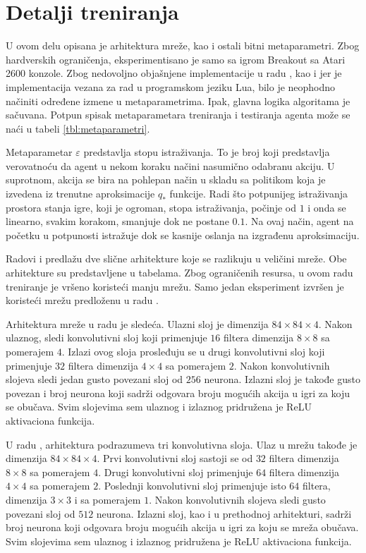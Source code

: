 \section{Detalji treniranja}
\label{sec:treniranje}
U ovom delu opisana je arhitektura mreže, kao i ostali bitni metaparametri. Zbog hardverskih ograničenja, eksperimentisano je samo sa igrom Breakout sa Atari 2600 konzole. Zbog nedovoljno objašnjene implementacije u radu \cite{dqn_mnih}, kao i jer je implementacija vezana za rad \cite{dqn_dm} u programskom jeziku Lua, bilo je neophodno načiniti određene izmene u metaparametrima. Ipak, glavna logika algoritama je sačuvana. Potpun spisak metaparametara treniranja i testiranja agenta može se naći u tabeli \ref{tbl:metaparametri}.
\par 
Metaparametar $\varepsilon$ predstavlja stopu istraživanja. To je broj koji predstavlja verovatnoću da agent u nekom koraku načini nasumično odabranu akciju. U suprotnom, akcija se bira na pohlepan način u skladu sa politikom koja je izvedena iz trenutne aproksimacije $q_*$ funkcije. Radi što potpunijeg istraživanja prostora stanja igre, koji je ogroman, stopa istraživanja, počinje od $1$ i onda se linearno, svakim korakom, smanjuje dok ne postane $0.1$. Na ovaj način, agent na početku u potpunosti istražuje dok se kasnije oslanja na izgrađenu aproksimaciju.
\par 
Radovi  \cite{dqn_mnih} i \cite{dqn_dm} predlažu dve slične arhitekture koje se razlikuju u veličini mreže. Obe arhitekture su predstavljene u tabelama. Zbog ograničenih resursa, u ovom radu treniranje je vršeno koristeći manju mrežu. Samo jedan eksperiment izvršen je koristeći mrežu predloženu u radu \cite{dqn_dm}.
\par 
Arhitektura mreže u radu \cite{dqn_mnih} je sledeća. Ulazni sloj je dimenzija $84 \times 84 \times 4$. Nakon ulaznog, sledi konvolutivni sloj koji primenjuje $16$ filtera dimenzija $8 \times 8$ sa pomerajem $4$. Izlazi ovog sloja prosleđuju se u drugi konvolutivni sloj koji primenjuje $32$ filtera dimenzija $4 \times 4$ sa pomerajem $2$. Nakon konvolutivnih slojeva sledi jedan gusto povezani sloj od $256$ neurona. Izlazni sloj je takođe gusto povezan i broj neurona koji sadrži odgovara broju mogućih akcija u igri za koju se obučava. Svim slojevima sem ulaznog i izlaznog pridružena je ReLU aktivaciona funkcija.
\par 
U radu \cite{dqn_dm}, arhitektura podrazumeva tri konvolutivna sloja. Ulaz u mrežu takođe je dimenzija $84 \times 84 \times 4$. Prvi konvolutivni sloj sastoji se od $32$ filtera dimenzija $8 \times 8$ sa pomerajem $4$. Drugi konvolutivni sloj primenjuje $64$ filtera dimenzija $4 \times 4$ sa pomerajem $2$. Poslednji konvolutivni sloj primenjuje isto $64$ filtera, dimenzija $3 \times 3$ i sa pomerajem $1$. Nakon konvolutivnih slojeva sledi gusto povezani sloj od $512$ neurona. Izlazni sloj, kao i u prethodnoj arhitekturi, sadrži broj neurona koji odgovara broju mogućih akcija u igri za koju se mreža obučava. Svim slojevima sem ulaznog i izlaznog pridružena je ReLU aktivaciona funkcija.
